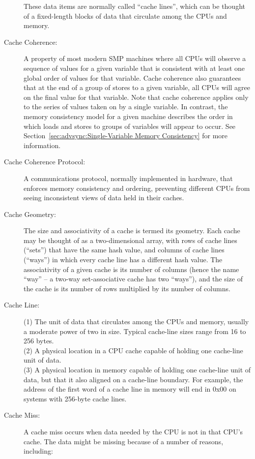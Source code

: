 \begin{description}
	These data items are normally called ``cache lines'', which
	can be thought of a fixed-length blocks of data that circulate
	among the CPUs and memory.
\item[Cache Coherence:]
	A property of most modern SMP machines where all CPUs will
	observe a sequence of values for a given variable that is
	consistent with at least one global order of values for
	that variable.
	Cache coherence also guarantees that at the end of a group
	of stores to a given variable, all CPUs will agree
	on the final value for that variable.
	Note that cache coherence applies only to the series of values
	taken on by a single variable.
	In contrast, the memory consistency model for a given machine
	describes the order in which loads and stores to groups of
	variables will appear to occur.
	See Section~\ref{sec:advsync:Single-Variable Memory Consistency}
	for more information.
\item[Cache Coherence Protocol:]
	A communications protocol, normally implemented in hardware,
	that enforces memory consistency and ordering, preventing
	different CPUs from seeing inconsistent views of data held
	in their caches.
\item[Cache Geometry:]
	The size and associativity of a cache is termed its geometry.
	Each cache may be thought of as a two-dimensional array,
	with rows of cache lines (``sets'') that have the same hash
	value, and columns of cache lines (``ways'') in which every
	cache line has a different hash value.
	The associativity of a given cache is its number of
	columns (hence the name ``way'' -- a two-way set-associative
	cache has two ``ways''), and the size of the cache is its
	number of rows multiplied by its number of columns.
\item[Cache Line:]
	(1) The unit of data that circulates among the CPUs and memory,
	usually a moderate power of two in size.
	Typical cache-line sizes range from 16 to 256 bytes. \\
	(2) A physical location in a CPU cache capable of holding
	one cache-line unit of data. \\
	(3) A physical location in memory capable of holding one
	cache-line unit of data, but that it also aligned
	on a cache-line boundary.
	For example, the address of the first word of a cache line
	in memory will end in 0x00 on systems with 256-byte cache lines.
\item[Cache Miss:]
	A cache miss occurs when data needed by the CPU is not in
	that CPU's cache.
	The data might be missing because of a number of reasons,
	including:

\end{description}

